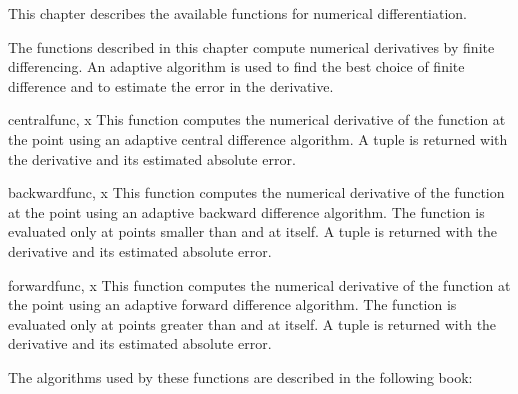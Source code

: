 
This chapter describes the available functions for numerical differentiation.

The functions described in this chapter compute numerical derivatives by finite
differencing.  An adaptive algorithm is used to find the best choice of finite
difference and to estimate the error in the derivative.


\begin{funcdesc}{central}{func, x}
   This function computes the numerical derivative of the function 
   at the point  using an adaptive central difference algorithm.  A
   tuple  is returned with the derivative and its
   estimated absolute error.
\end{funcdesc}

\begin{funcdesc}{backward}{func, x}
   This function computes the numerical derivative of the function 
   at the point  using an adaptive backward difference algorithm.  The
   function  is evaluated only at points smaller than  and at
    itself.  A tuple  is returned with the
   derivative and its estimated absolute error.
\end{funcdesc}

\begin{funcdesc}{forward}{func, x}
   This function computes the numerical derivative of the function 
   at the point  using an adaptive forward difference algorithm.  The
   function  is evaluated only at points greater than  and at
    itself.  A tuple  is returned with the
   derivative and its estimated absolute error.
\end{funcdesc}


\begin{seealso}
   The algorithms used by these functions are described in the following book:
\end{seealso}



